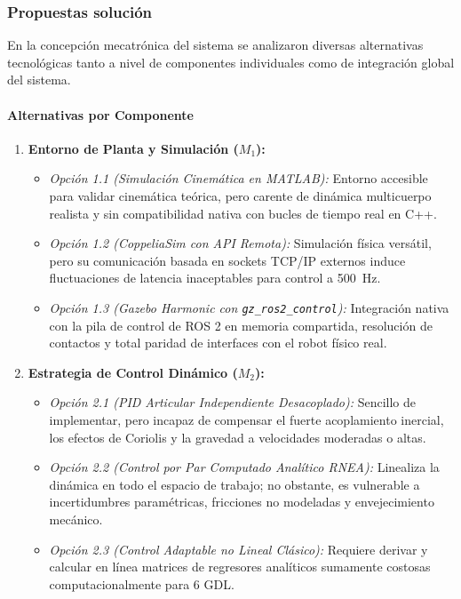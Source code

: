 \documentclass[12pt]{article}
\begin{document}
\subsubsection{Propuestas solución}
\label{sssec:propuestas_solucion}

En la concepción mecatrónica del sistema se analizaron diversas alternativas tecnológicas tanto a nivel de componentes individuales como de integración global del sistema.

\paragraph{Alternativas por Componente}
\begin{enumerate}
    \item \textbf{Entorno de Planta y Simulación ($M_1$):}
    \begin{itemize}
        \item \textit{Opción 1.1 (Simulación Cinemática en MATLAB):} Entorno accesible para validar cinemática teórica, pero carente de dinámica multicuerpo realista y sin compatibilidad nativa con bucles de tiempo real en C++.
        \item \textit{Opción 1.2 (CoppeliaSim con API Remota):} Simulación física versátil, pero su comunicación basada en sockets TCP/IP externos induce fluctuaciones de latencia inaceptables para control a 500~Hz.
        \item \textit{Opción 1.3 (Gazebo Harmonic con \texttt{gz\_ros2\_control}):} Integración nativa con la pila de control de ROS 2 en memoria compartida, resolución de contactos y total paridad de interfaces con el robot físico real.
    \end{itemize}
    \item \textbf{Estrategia de Control Dinámico ($M_2$):}
    \begin{itemize}
        \item \textit{Opción 2.1 (PID Articular Independiente Desacoplado):} Sencillo de implementar, pero incapaz de compensar el fuerte acoplamiento inercial, los efectos de Coriolis y la gravedad a velocidades moderadas o altas.
        \item \textit{Opción 2.2 (Control por Par Computado Analítico RNEA):} Linealiza la dinámica en todo el espacio de trabajo; no obstante, es vulnerable a incertidumbres paramétricas, fricciones no modeladas y envejecimiento mecánico.
        \item \textit{Opción 2.3 (Control Adaptable no Lineal Clásico):} Requiere derivar y calcular en línea matrices de regresores analíticos sumamente costosas computacionalmente para 6 GDL.

\end{itemize}
\end{enumerate}
\end{document}

